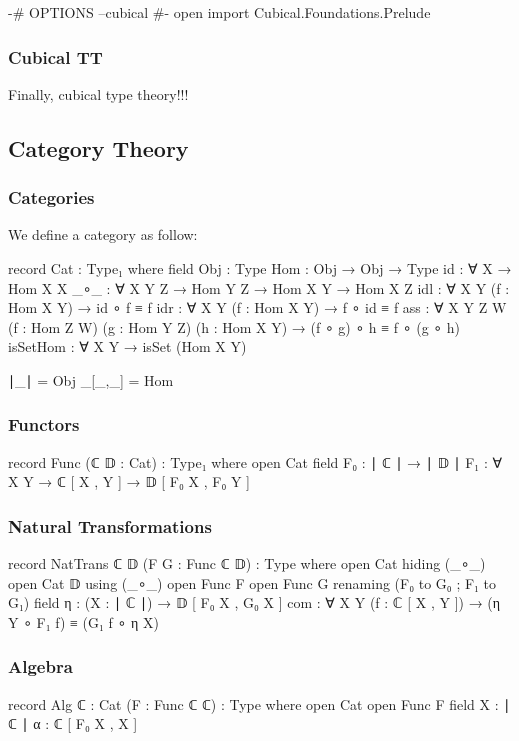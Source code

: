 \begin{code}[hide]
{-# OPTIONS --cubical #-}
open import Cubical.Foundations.Prelude
\end{code}

\subsubsection*{Cubical TT}

Finally, cubical type theory!!!

\subsection{Category Theory}

\subsubsection*{Categories}

We define a category as follow:

\begin{code}
record Cat : Type₁ where
  field
    Obj : Type
    Hom : Obj → Obj → Type
    id  : ∀ {X} → Hom X X
    _∘_ : ∀ {X Y Z} → Hom Y Z → Hom X Y → Hom X Z
    idl : ∀ {X Y} (f : Hom X Y) → id ∘ f ≡ f
    idr : ∀ {X Y} (f : Hom X Y) → f ∘ id ≡ f
    ass : ∀ {X Y Z W} (f : Hom Z W) (g : Hom Y Z) (h : Hom X Y)
      → (f ∘ g) ∘ h ≡ f ∘ (g ∘ h)
    isSetHom : ∀ {X Y} → isSet (Hom X Y)

  ∣_∣ = Obj
  _[_,_] = Hom
\end{code}

\subsubsection*{Functors}

\begin{code}
record Func (ℂ 𝔻 : Cat) : Type₁ where
  open Cat
  field
    F₀ : ∣ ℂ ∣ → ∣ 𝔻 ∣
    F₁ : ∀ {X Y} → ℂ [ X , Y ] → 𝔻 [ F₀ X , F₀ Y ]
\end{code}

\subsubsection*{Natural Transformations}

\begin{code}
record NatTrans {ℂ 𝔻} (F G : Func ℂ 𝔻) : Type where
  open Cat hiding (_∘_)
  open Cat 𝔻 using (_∘_)
  open Func F
  open Func G renaming (F₀ to G₀ ; F₁ to G₁)
  field
    η : (X : ∣ ℂ ∣) → 𝔻 [ F₀ X , G₀ X ]
    com : ∀ {X Y} (f : ℂ [ X , Y ]) → (η Y ∘ F₁ f) ≡ (G₁ f ∘ η X)
\end{code}

\subsubsection*{Algebra}

\begin{code}
record Alg {ℂ : Cat} (F : Func ℂ ℂ) : Type where
  open Cat
  open Func F
  field
    X : ∣ ℂ ∣
    α : ℂ [ F₀ X , X ]
\end{code}
